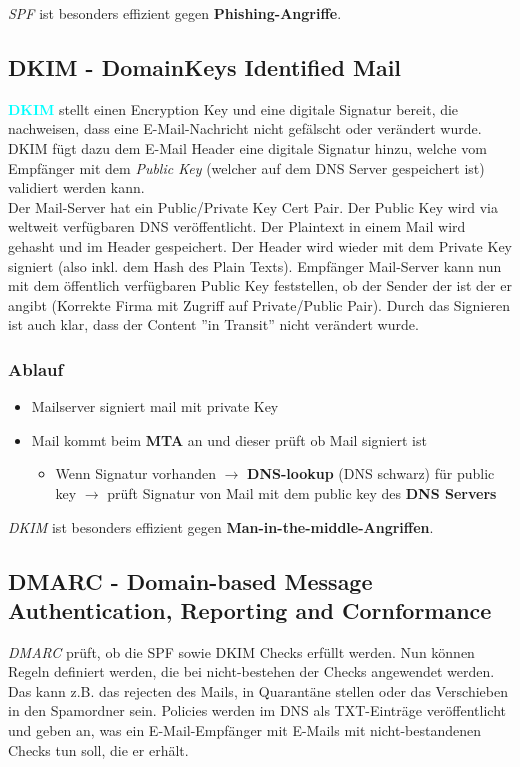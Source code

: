 \textit{SPF} ist besonders effizient gegen \textcolor{OSTPink}{\textbf{Phishing-Angriffe}}.

\subsection{DKIM - DomainKeys Identified Mail}
\textcolor{cyan}{\textbf{DKIM}} stellt einen Encryption Key und eine digitale Signatur bereit, die nachweisen, dass eine E-Mail-Nachricht nicht gefälscht oder verändert wurde.
DKIM fügt dazu dem E-Mail Header eine digitale Signatur hinzu, welche vom Empfänger mit dem \textit{Public Key} (welcher auf dem DNS Server gespeichert ist) validiert werden kann.\\

Der Mail-Server hat ein Public/Private Key Cert Pair. Der Public Key wird via weltweit verfügbaren DNS veröffentlicht. 
Der Plaintext in einem Mail wird gehasht und im Header gespeichert. 
Der Header wird wieder mit dem Private Key signiert (also inkl. dem Hash des Plain Texts). 
Empfänger Mail-Server kann nun mit dem öffentlich verfügbaren Public Key feststellen, ob der Sender der ist der er angibt (Korrekte Firma mit Zugriff auf Private/Public Pair). 
Durch das Signieren ist auch klar, dass der Content ''in Transit'' nicht verändert wurde.

\subsubsection{Ablauf}
\begin{itemize}
    \item Mailserver signiert mail mit private Key
    \item Mail kommt beim \textcolor{OSTPink}{\textbf{MTA}} an und dieser prüft ob Mail signiert ist
    \begin{itemize}
        \item Wenn Signatur vorhanden $\rightarrow$ \textbf{DNS-lookup} (DNS schwarz) für public key $\rightarrow$ prüft Signatur von Mail mit dem public key des \textbf{DNS Servers}\\
    \end{itemize}
\end{itemize}

\textit{DKIM} ist besonders effizient gegen \textcolor{OSTPink}{\textbf{Man-in-the-middle-Angriffen}}.

\subsection{DMARC - Domain-based Message Authentication, Reporting and Cornformance}
\textit{DMARC} prüft, ob die SPF sowie DKIM Checks erfüllt werden. Nun können Regeln definiert werden, die bei nicht-bestehen der Checks angewendet werden. Das kann z.B. das rejecten des Mails, in Quarantäne stellen oder das Verschieben in den Spamordner sein.
Policies werden im DNS als TXT-Einträge veröffentlicht und geben an, was ein E-Mail-Empfänger mit E-Mails mit nicht-bestandenen Checks tun soll, die er erhält.\\

